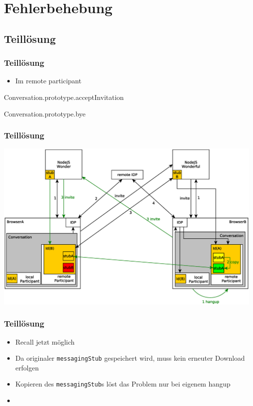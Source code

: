 \documentclass{beamer}
\begin{document}
\section{Fehlerbehebung}
\subsection{Teillösung}
\begin{frame}
	\frametitle{Teillösung}
	\begin{itemize}[<+->]
		\item Im remote participant
	\end{itemize}

	\begin{exampleblock}{Conversation.prototype.acceptInvitation}
	
	\end{exampleblock}

	\begin{exampleblock}{Conversation.prototype.bye}
	
	\end{exampleblock}

\end{frame}

\begin{frame}
	\frametitle{Teillösung}
	\includegraphics[scale=0.365,centered]{pictures/fix1}
\end{frame}

\begin{frame}
	\frametitle{Teillösung}
	\begin{itemize}
		\item Recall jetzt möglich
		\item Da originaler \texttt{messagingStub} gespeichert wird, muss kein erneuter Download erfolgen
		\item Kopieren des \texttt{messagingStub}s löst das Problem nur bei eigenem hangup
		\item 
	\end{itemize}
\end{frame}
\end{document}
